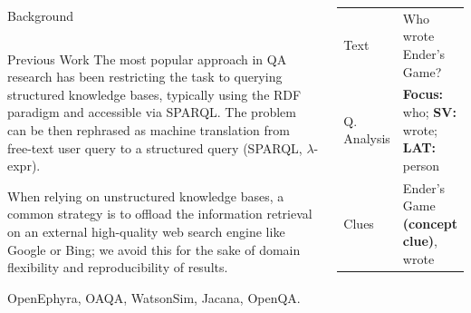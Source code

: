 \documentclass[xcolor=table]{beamer}
\begin{document}
\begin{frame}[fragile]{}
\begin{columns}[t]
\begin{block}{Background}
\begin{columns}[t]
\begin{block}{Previous Work}
The most popular approach in QA research has been restricting
the task to querying \alert{structured knowledge bases}, typically using the
RDF paradigm and accessible via SPARQL\@.  The problem can
be then rephrased as \alert{machine translation} from free-text user query
to a structured query (SPARQL, $\lambda$-expr).

When relying on unstructured knowledge bases, a common strategy is to offload
the information retrieval on an external high-quality \alert{web search} engine
like Google or Bing; we avoid this for the sake of domain flexibility and
reproducibility of results.

 OpenEphyra, OAQA, WatsonSim, Jacan\-a, OpenQA.
	\end{block}
      \end{columns}
    \end{block}

    \vspace{1ex}
    \vspace{-0.5ex}

\begin{columns}[t]

\centering
\footnotesize
\begin{tabular}{|p{3.6cm}p{13cm}|}
\hline
Text & \hspace{0pt}\alert{Who wrote Ender's Game?} \\
Q. Analysis & \textbf{Focus:} who; \textbf{SV:} wrote; \textbf{LAT:} person \\
Clues & Ender's Game \textbf{(concept clue)}, wrote \\ \hline


\end{tabular}
\end{columns}
\end{columns}
\end{frame}
\end{document}
